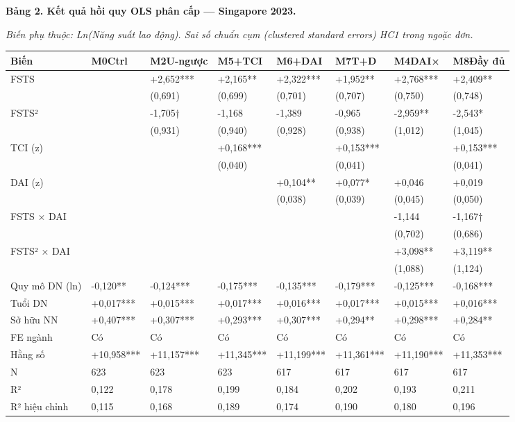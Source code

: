 \documentclass[12pt,a4paper]{article}
\begin{document}
\textbf{Bảng 2. Kết quả hồi quy OLS phân cấp --- Singapore 2023.}

\emph{Biến phụ thuộc: Ln(Năng suất lao động). Sai số chuẩn cụm
(clustered standard errors) HC1 trong ngoặc đơn.}

\begin{longtable}[]{@{}llllllll@{}}
\toprule\noalign{}
Biến & M0Ctrl & M2U-ngược & M5+TCI & M6+DAI & M7T+D & M4DAI× & M8Đầy
đủ \\
\midrule\noalign{}
\endhead
\bottomrule\noalign{}
\endlastfoot
FSTS & & +2,652*** & +2,165** & +2,322*** & +1,952** & +2,768*** &
+2,409** \\
& & (0,691) & (0,699) & (0,701) & (0,707) & (0,750) & (0,748) \\
FSTS² & & -1,705† & -1,168 & -1,389 & -0,965 & -2,959** & -2,543* \\
& & (0,931) & (0,940) & (0,928) & (0,938) & (1,012) & (1,045) \\
TCI (z) & & & +0,168*** & & +0,153*** & & +0,153*** \\
& & & (0,040) & & (0,041) & & (0,041) \\
DAI (z) & & & & +0,104** & +0,077* & +0,046 & +0,019 \\
& & & & (0,038) & (0,039) & (0,045) & (0,050) \\
FSTS × DAI & & & & & & -1,144 & -1,167† \\
& & & & & & (0,702) & (0,686) \\
FSTS² × DAI & & & & & & +3,098** & +3,119** \\
& & & & & & (1,088) & (1,124) \\
Quy mô DN (ln) & -0,120** & -0,124*** & -0,175*** & -0,135*** &
-0,179*** & -0,125*** & -0,168*** \\
Tuổi DN & +0,017*** & +0,015*** & +0,017*** & +0,016*** & +0,017*** &
+0,015*** & +0,016*** \\
Sở hữu NN & +0,407*** & +0,307*** & +0,293*** & +0,307*** & +0,294** &
+0,298*** & +0,284** \\
FE ngành & Có & Có & Có & Có & Có & Có & Có \\
Hằng số & +10,958*** & +11,157*** & +11,345*** & +11,199*** & +11,361***
& +11,190*** & +11,353*** \\
N & 623 & 623 & 623 & 617 & 617 & 617 & 617 \\
R² & 0,122 & 0,178 & 0,199 & 0,184 & 0,202 & 0,193 & 0,211 \\
R² hiệu chỉnh & 0,115 & 0,168 & 0,189 & 0,174 & 0,190 & 0,180 & 0,196 \\
\end{longtable}
\end{document}
